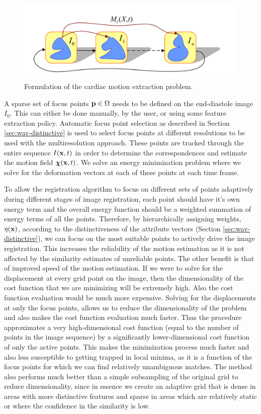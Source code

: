 \begin{figure}
\begin{center}
\includegraphics[width=.75\textwidth]{images/motion-est} 
\caption{Formulation of the cardiac motion extraction problem.}
\label{fig:motion}
\end{center}  
\end{figure} 

A sparse set of focus points $\mathbf{p} \in \Omega$ needs to be defined on the end-diastole image $I_0$. This can either be done manually, by the user, or using some feature extraction policy. Automatic focus point selection as described in Section \ref{sec:wav-distinctive} is used to select focus points at different resolutions to be used with the multiresolution approach. These points are tracked through the entire sequence $I(\mathbf{x}, t)$ in order to determine the correspondences and estimate the motion field ${\boldsymbol{\chi}} ( \mathbf{x}, t )$. We solve an energy minimization problem where we solve for the deformation vectors at each of these points at each time frame.

To allow the registration algorithm to focus on different sets of points adaptively during different stages of image registration, each point should have it's own energy term and the overall energy function should be a weighted summation of energy terms of all the points. Therefore, by hierarchically assigning weights, $\eta ( \mathbf{x})$,  according to the distinctiveness of the attribute vectors (Section \ref{sec:wav-distinctive}), we can focus on the most suitable points to actively drive the image registration. This increases the reliability of the motion estimation as it is not affected by the similarity estimates of unreliable points. The other benefit is that of improved speed of the motion estimation. If we were to solve for the displacement at every grid point on the image, then the dimensionality of the cost function that we are minimizing will be extremely high. Also the cost function evaluation would be much more expensive. Solving for the displacements at only the focus points, allows us to reduce the dimensionality of the problem and also makes the cost function evaluation much faster. Thus the procedure approximates a very high-dimensional cost function (equal to the number of points in the image sequence) by a significantly lower-dimensional cost function of only the active points. This makes the minimization process much faster and also less susceptible to getting trapped in local minima, as it is a function of the focus points for which we can find relatively unambiguous matches. The method also performs much better than a simple subsampling of the original grid to reduce dimensionality, since in essence we create an adaptive grid that is dense in areas with more distinctive features and sparse in areas which are relatively static or where the confidence in the similarity is low.


